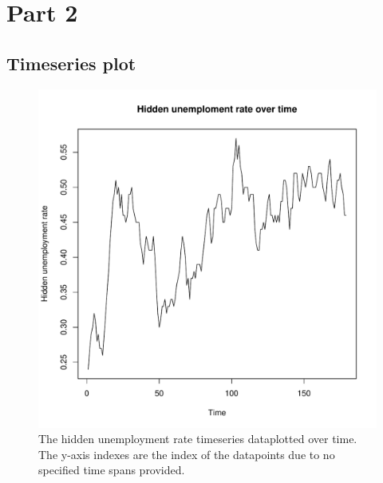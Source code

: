 \documentclass[12pt,a4paper,twoside]{article}
\begin{document}
\newpage

\section{Part 2}
\subsection{Timeseries plot}
\label{sec:timeseriesplot}
\begin{figure}[!ht]
    \centering
    \includegraphics[width=\linewidth]{img/unemployment_time_series.pdf}
    \caption{The hidden unemployment rate timeseries dataplotted over time. The y-axis indexes are the index of the
    datapoints due to no specified time spans provided.}
    \label{fig:timeseriesplot}
\end{figure}

\newpage
\end{document}
